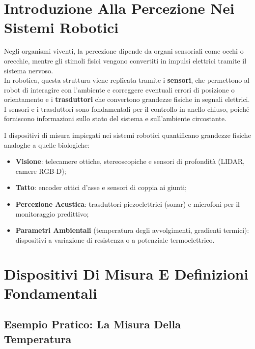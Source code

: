 ﻿\documentclass[11pt, a4paper]{article}
\author{Francesco Lo Verde}
\begin{document}
\tableofcontents

\newpage
\section{Introduzione Alla Percezione Nei Sistemi Robotici}
Negli organismi viventi, la percezione dipende da organi sensoriali come occhi o orecchie, mentre gli stimoli fisici vengono convertiti in impulsi elettrici tramite il sistema nervoso.\\
In robotica, questa struttura viene replicata tramite i \textbf{sensori}, che permettono al robot di interagire con l'ambiente e correggere eventuali errori di posizione o orientamento e i \textbf{trasduttori} che convertono grandezze fisiche in segnali elettrici. I sensori e i trasduttori sono fondamentali per il controllo in anello chiuso, poiché forniscono informazioni sullo stato del sistema e sull'ambiente circostante.

I dispositivi di misura impiegati nei sistemi robotici quantificano grandezze fisiche analoghe a quelle biologiche:
\begin{itemize}
    \item \textbf{Visione}: telecamere ottiche, stereoscopiche e sensori di profondità (LIDAR, camere RGB-D);
    \item \textbf{Tatto}: encoder ottici d'asse e sensori di coppia ai giunti;
    \item \textbf{Percezione Acustica}: trasduttori piezoelettrici (sonar) e microfoni per il monitoraggio predittivo;
    \item \textbf{Parametri Ambientali} (temperatura degli avvolgimenti, gradienti termici): dispositivi a variazione di resistenza o a potenziale termoelettrico.
\end{itemize}

\section{Dispositivi Di Misura E Definizioni Fondamentali}

\subsection{Esempio Pratico: La Misura Della Temperatura}
\end{document}
